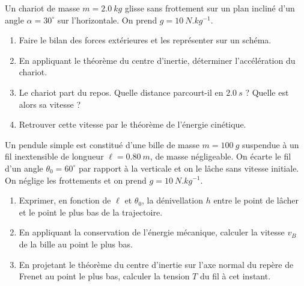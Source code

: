 \documentclass[11pt]{article}
\newcounter{popsec}
\newcounter{popsub}
\newcommand{\courssub}[1]{%
  \stepcounter{popsub}%
  \par\vspace{9pt}\noindent{\popxbold\fontsize{11.5}{13}\selectfont\color{popink}{\color{poporange}\thepopsec.\thepopsub}\hspace{6pt}#1}\par\nopagebreak\vspace{4pt}
}
\begin{document}
\courssub{Je m'entraîne}

\begin{exercice}
Un chariot de masse $m = \SI{2,0}{kg}$ glisse sans frottement sur un plan incliné d'un angle $\alpha = 30^{\circ}$ sur l'horizontale. On prend $g = \SI{10}{N.kg^{-1}}$.
\begin{enumerate}
\item Faire le bilan des forces extérieures et les représenter sur un schéma.
\item En appliquant le théorème du centre d'inertie, déterminer l'accélération du chariot.
\item Le chariot part du repos. Quelle distance parcourt-il en $\SI{2,0}{s}$ ? Quelle est alors sa vitesse ?
\item Retrouver cette vitesse par le théorème de l'énergie cinétique.
\end{enumerate}
\end{exercice}

\begin{exercice}
Un pendule simple est constitué d'une bille de masse $m = \SI{100}{g}$ suspendue à un fil inextensible de longueur $\ell = \SI{0,80}{m}$, de masse négligeable. On écarte le fil d'un angle $\theta_0 = 60^{\circ}$ par rapport à la verticale et on le lâche sans vitesse initiale. On néglige les frottements et on prend $g = \SI{10}{N.kg^{-1}}$.
\begin{enumerate}
\item Exprimer, en fonction de $\ell$ et $\theta_0$, la dénivellation $h$ entre le point de lâcher et le point le plus bas de la trajectoire.
\item En appliquant la conservation de l'énergie mécanique, calculer la vitesse $v_B$ de la bille au point le plus bas.
\item En projetant le théorème du centre d'inertie sur l'axe normal du repère de Frenet au point le plus bas, calculer la tension $T$ du fil à cet instant.
\end{enumerate}
\end{exercice}
\end{document}
